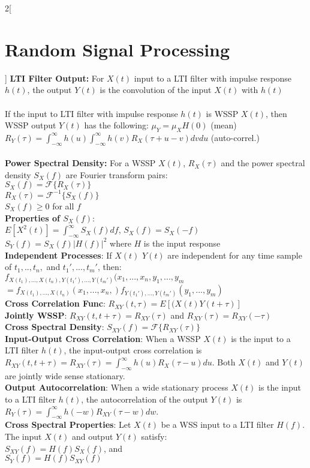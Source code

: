 \documentclass{article}
\begin{document}
	\begin{multicols}{2}[\section*{Random Signal Processing}]
	\textbf{LTI Filter Output:} For $X(t)$ input to a LTI filter with impulse response $h(t)$, the output $Y(t)$ is the convolution of the input $X(t)$ with $h(t)$\\
	\\
	If the input to LTI filter with impulse response $h(t)$ is WSSP $X(t)$, then WSSP output $Y(t)$ has the following: $\mu_Y = \mu_XH(0)$ (mean)\\ $R_Y(\tau) = \int_{-\infty}^{\infty}h(u)\int_{-\infty}^{\infty}h(v)R_X(\tau + u - v)dvdu$ (auto-correl.)\\ \\
	\textbf{Power Spectral Density:} For a WSSP $X(t)$, $R_X(\tau)$ and the power spectral density $S_X(f)$ are Fourier transform pairs:\\$S_X(f) = \mathcal{F}\{R_X(\tau)\}$\\$R_X(\tau) = \mathcal{F}^{-1}\{S_X(f)\}$\\ $S_X(f) \geq 0$ for all $f$\\

	\textbf{Properties of $S_X(f)$}:\\
    $E[X^2(t)] = \int_{-\infty}^{\infty}S_X(f)df$, $S_X(f) = S_X(-f)$\\
    $S_Y(f) = S_X(f) \vert H(f) \vert^2$ where $H$ is the input response\\
	
    \textbf{Independent Processes}: If $X(t)$ $Y(t)$ are independent for any time sample of $t_1, .., t_n,$ and $t_1', ..., t_m'$, then:
	\\
	$f_{X(t_1), ..., X(t_n), Y(t_1'), ..., Y(t_m' )}(x_1, ..., x_n, y_1, ..., y_m$\\$ = f_{X(t_1), ...,X(t_n)}(x_1, ..., x_n,)f_{Y(t_1'), ...,Y(t_m' )}(y_1, ..., y_m)$
	\\
	\textbf{Cross Correlation Func}: $R_{XY}(t, \tau) = E[(X(t)Y(t + \tau)]$
	\\
	\textbf{Jointly WSSP}: $R_{XY}(t, t + \tau) = R_{XY}(\tau)$ and $R_{XY}(\tau) = R_{XY}(-\tau)$
	\\
	\textbf{Cross Spectral Density}: $S_{XY}(f) = \mathcal{F}\{R_{XY}(\tau)\}$
	\\
	\textbf{Input-Output Cross Correlation}: When a WSSP $X(t)$ is the input to a LTI filter $h(t)$, the input-output cross correlation is $R_{XY}(t, t + \tau) = R_{XY}(\tau) = \int_{-\infty}^{\infty}h(u)R_X(\tau - u)du$. Both $X(t)$ and $Y(t)$ are jointly wide sense stationary.
	\\
	\textbf{Output Autocorrelation}: When a wide stationary process $X(t)$ is the input to a LTI filter $h(t)$, the autocorrelation of the output $Y(t)$ is $R_Y(\tau) = \int_{-\infty}^{\infty}h(-w)R_{XY}(\tau - w)dw$.
	\\
	\textbf{Cross Spectral Properties}: Let $X(t)$ be a WSS input to a LTI filter $H(f)$. The input $X(t)$ and output $Y(t)$ satisfy:\\
    $S_{XY}(f) = H(f)S_X(f)$, and\\
    $S_Y(f) = H(f)S_{XY}(f)$
   	\end{multicols}
\end{document}
